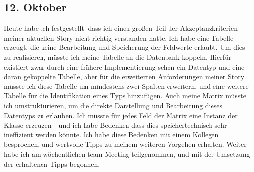 \subsection{12. Oktober}
Heute habe ich festgestellt, dass ich einen großen Teil der Akzeptanzkriterien meiner aktuellen Story nicht richtig verstanden hatte. Ich habe eine Tabelle erzeugt, die keine Bearbeitung und Speicherung der Feldwerte erlaubt. Um dies zu realisieren, müsste ich meine Tabelle an die Datenbank koppeln. Hierfür existiert zwar durch eine frühere Implementierung schon ein Datentyp und eine daran gekoppelte Tabelle, aber für die erweiterten Anforderungen meiner Story müsste ich diese Tabelle um mindestens zwei Spalten erweitern, und eine weitere Tabelle für die Identifikation eines Typs hinzufügen. Auch meine Matrix müsste ich umstrukturieren, um die direkte Darstellung und Bearbeitung dieses Datentyps zu erlauben. Ich müsste für jedes Feld der Matrix eine Instanz der Klasse erzeugen - und ich habe Bedenken dass dies speichertechnisch sehr ineffizient werden könnte. Ich habe diese Bedenken mit einem Kollegen besprochen, und wertvolle Tipps zu meinem weiteren Vorgehen erhalten. Weiter habe ich am wöchentlichen team-Meeting teilgenommen, und mit der Umsetzung der erhaltenen Tipps begonnen.